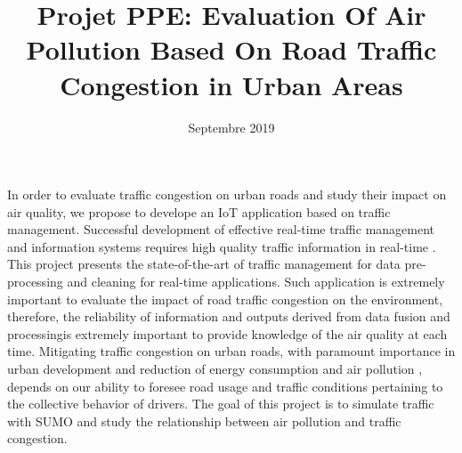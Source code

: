 \documentclass[a4paper]{article}
\title{\textbf{Projet PPE:} Evaluation Of Air Pollution Based On  Road Traffic Congestion in Urban Areas}
\date{Septembre 2019}
\begin{document}
\maketitle


In order to evaluate traffic congestion on urban roads and study their impact on air quality, we propose to develope an IoT application based on traffic management.
Successful development of effective real-time traffic management and information systems requires high quality traffic information in real-time \cite{lopes_traffic_2010}.
This project presents the state-of-the-art of traffic management for data pre-processing and cleaning for real-time applications.
Such application is extremely important to evaluate the impact of road traffic congestion on the environment,
	therefore,
	the reliability of information and outputs derived from data fusion and processingis extremely important to provide knowledge of the air quality at each time.
Mitigating traffic congestion on urban roads,
	with paramount importance in urban development and reduction of energy consumption and air pollution \cite{wang_predictability_2015},
	depends on our ability to foresee road usage and traffic conditions pertaining to the collective behavior of drivers.
The goal of this project is to simulate traffic with SUMO \cite{behrisch_sumo_2011} and study the relationship between air pollution and traffic congestion.


\printbibliography


\end{document}
